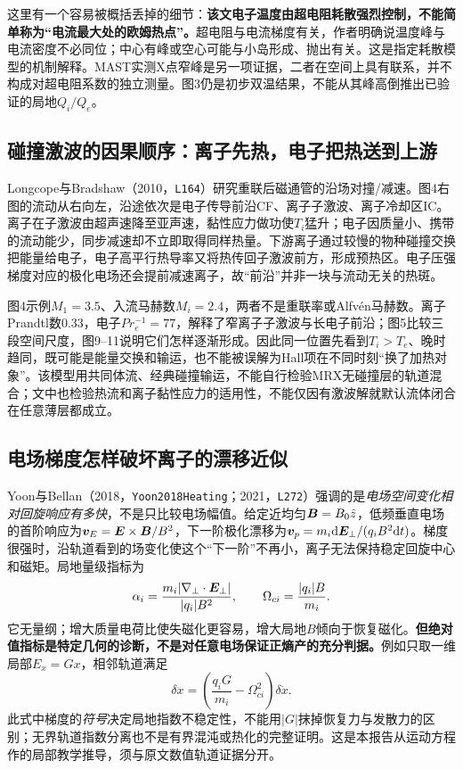 这里有一个容易被概括丢掉的细节：\textbf{该文电子温度由超电阻耗散强烈控制，不能简单称为“电流最大处的欧姆热点”。}超电阻与电流梯度有关，作者明确说温度峰与电流密度不必同位；中心有峰或空心可能与小岛形成、抛出有关。这是指定耗散模型的机制解释。MAST实测X点窄峰是另一项证据，二者在空间上具有联系，并不构成对超电阻系数的独立测量。图3仍是初步双温结果，不能从其峰高倒推出已验证的局地$Q_i/Q_e$。

\subsection{碰撞激波的因果顺序：离子先热，电子把热送到上游}
Longcope与Bradshaw（2010，\texttt{L164}）研究重联后磁通管的沿场对撞/减速。图4右图的流动从右向左，沿途依次是电子传导前沿CF、离子子激波、离子冷却区IC。离子在子激波由超声速降至亚声速，黏性应力做功使$T_i$猛升；电子因质量小、携带的流动能少，同步减速却不立即取得同样热量。下游离子通过较慢的物种碰撞交换把能量给电子，电子高平行热导率又将热传回子激波前方，形成预热区。电子压强梯度对应的极化电场还会提前减速离子，故“前沿”并非一块与流动无关的热斑。\citep{L164}

图4示例$M_1=3.5$、入流马赫数$M_i=2.4$，两者不是重联率或Alfvén马赫数。离子Prandtl数$0.33$，电子$Pr_e^{-1}=77$，解释了窄离子子激波与长电子前沿；图5比较三段空间尺度，图9--11说明它们怎样逐渐形成。因此同一位置先看到$T_i>T_e$、晚时趋同，既可能是能量交换和输运，也不能被误解为Hall项在不同时刻“换了加热对象”。该模型用共同体流、经典碰撞输运，不能自行检验MRX无碰撞层的轨道混合；文中也检验热流和离子黏性应力的适用性，不能仅因有激波解就默认流体闭合在任意薄层都成立。

\subsection{电场梯度怎样破坏离子的漂移近似}
Yoon与Bellan（2018，\texttt{Yoon2018Heating}；2021，\texttt{L272}）强调的是\emph{电场空间变化相对回旋响应有多快}，不是只比较电场幅值。给定近均匀$\bm{B}=B_0\hat z$，低频垂直电场的首阶响应为$\bm{v}_E=\bm{E}\times\bm{B}/B^2$，下一阶极化漂移为$\bm{v}_p=m_i\mathrm d\bm{E}_\perp/(q_iB^2\mathrm d t)$。梯度很强时，沿轨道看到的场变化使这个“下一阶”不再小，离子无法保持稳定回旋中心和磁矩。局地量级指标为
\begin{equation}
\alpha_i=\frac{m_i|\nabla_\perp\cdot\bm{E}_\perp|}{|q_i|B^2},\qquad
\Omega_{ci}=\frac{|q_i|B}{m_i}.
\end{equation}
它无量纲；增大质量电荷比使失磁化更容易，增大局地$B$倾向于恢复磁化。\textbf{但绝对值指标是特定几何的诊断，不是对任意电场保证正熵产的充分判据。}例如只取一维局部$E_x=Gx$，相邻轨道满足
\begin{equation}
\delta\dddot x=\left(\frac{q_iG}{m_i}-\Omega_{ci}^2\right)\delta\dot x.
\end{equation}
此式中梯度的\emph{符号}决定局地指数不稳定性，不能用$|G|$抹掉恢复力与发散力的区别；无界轨道指数分离也不是有界混沌或热化的完整证明。这是本报告从运动方程作的局部教学推导，须与原文数值轨道证据分开。\citep{Yoon2018Heating,L272}

